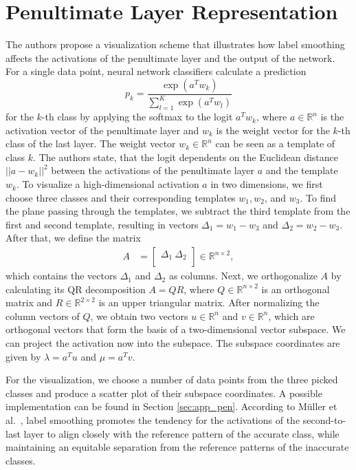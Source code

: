\section{Penultimate Layer Representation}\label{sec:plr}
The authors propose a visualization scheme that illustrates how label smoothing affects the activations of the penultimate layer and the output of the network.
For a single data point, neural network classifiers calculate a prediction \begin{equation}
    p_k = \frac{\exp{(a^T w_k)}}{\sum_{l=1}^K \exp{(a^T w_l)}}\label{eq:softmax}
\end{equation} for the $k$-th class by applying the softmax to the logit $a^Tw_k$, where $a\in \mathbb{R}^{n}$ is the activation vector of the penultimate layer and $w_k$ is the weight vector for the $k$-th class of the last layer. The weight vector $w_k\in \mathbb{R}^{n}$ can be seen as a template of class $k$.
The authors state, that the logit dependents on the Euclidean distance $||a-w_k||^2$ between the activations of the penultimate layer $a$ and the template $w_k$. 
To visualize a high-dimensional activation $a$ in two dimensions, we first choose three classes and their corresponding templates $w_1, w_2$, and $w_3$. To find the plane passing through the templates, we subtract the third template from the first and second template, resulting in vectors $\Delta_1 = w_1 - w_3$ and $\Delta_2 = w_2 - w_3$. 
After that, we define the matrix 
\begin{align*}
A &= \begin{bmatrix}
           \Delta_1~\Delta_2 \\
     \end{bmatrix}\in \mathbb{R}^{n\times 2},
\end{align*}
which contains the vectors  $\Delta_1$ and $\Delta_2$ as columns. Next, we  orthogonalize $A$ by calculating its QR decomposition $A= QR$, where $Q\in\mathbb{R}^{n\times 2}$ is an orthogonal matrix  and  $R \in \mathbb{R}^{2 \times 2}$ is an upper triangular matrix. After normalizing the column vectors of $Q$, we obtain two vectors $u \in \mathbb{R}^n$ and $v \in \mathbb{R}^n$, which are orthogonal vectors that form the basis of a two-dimensional vector subspace. We can project the activation now into the subspace. The subspace coordinates are given by $\lambda=a^Tu$ and $\mu=a^Tv$.

For the visualization, we choose a number of data points from the three picked classes and produce a scatter plot of their subspace coordinates. A possible implementation can be found in Section \ref{sec:app_pen}.
According to Müller et al.~\cite{mueller2019}, label smoothing promotes the tendency for the activations of the second-to-last layer to align closely with the reference pattern of the accurate class, while maintaining an equitable separation from the reference patterns of the inaccurate classes.

